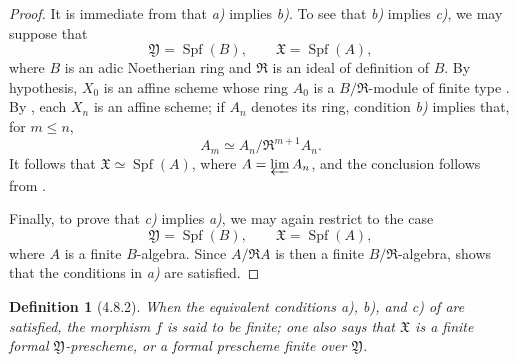 \documentclass[oneside]{amsart}
\theoremstyle{ega-env-style}
\theoremstyle{ega-thm-env-style}
\theoremstyle{ega-defn-env-style}
\newtheorem*{definition}{Definition}
\def\leq{\leqslant}                 %
\def\Spf{\operatorname{Spf}}
\let\EGAOriginalLabel\label
\renewcommand{\label}[1]{\phantomsection\EGAOriginalLabel{#1}}
\begin{document}
\begin{proof}
It is immediate from  that \emph{a)} implies
\emph{b)}.  To see that \emph{b)} implies \emph{c)}, we may suppose
that
\[
  \mathfrak{Y}=\Spf(B),\qquad \mathfrak{X}=\Spf(A),
\]
where $B$ is an adic Noetherian ring and $\mathfrak{R}$ is an ideal
of definition of $B$.  By hypothesis, $X_0$ is an affine scheme
whose ring $A_0$ is a $B/\mathfrak{R}$-module of finite type
.  By , each $X_n$ is an affine
scheme; if $A_n$ denotes its ring, condition \emph{b)} implies that,
for $m\leq n$,
\[
  A_m\simeq A_n/\mathfrak{R}^{m+1}A_n.
\]
It follows that $\mathfrak{X}\simeq\Spf(A)$, where
$A=\varprojlim A_n$, and the conclusion follows from
.

Finally, to prove that \emph{c)} implies \emph{a)}, we may again
restrict to the case
\[
  \mathfrak{Y}=\Spf(B),\qquad \mathfrak{X}=\Spf(A),
\]
where $A$ is a finite $B$-algebra.  Since
$A/\mathfrak{R}A$ is then a finite
$B/\mathfrak{R}$-algebra,  shows that the
conditions in \emph{a)} are satisfied.
\end{proof}

\begin{definition}[4.8.2]
\label{III.4.8.2}
When the equivalent conditions \emph{a)}, \emph{b)}, and \emph{c)}
of  are satisfied, the morphism $f$ is said to be
\emph{finite}; one also says that $\mathfrak{X}$ is a
\emph{finite formal $\mathfrak{Y}$-prescheme}, or a formal
prescheme \emph{finite over $\mathfrak{Y}$}.
\end{definition}
\end{document}
